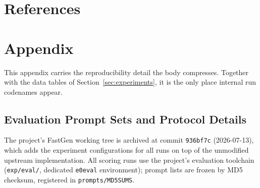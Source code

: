\documentclass[11pt,a4paper]{article}
\begin{document}
\renewcommand{\refname}{}
\section{References}\label{sec:references}
\vspace{-2em}



\section{Appendix}\label{sec:appendix}

This appendix carries the reproducibility detail the body compresses. Together with the data tables of Section~\ref{sec:experiments}, it is the only place internal run codenames appear.

\subsection{Evaluation Prompt Sets and Protocol Details}\label{sec:app-protocol}

The project's FastGen working tree is archived at commit \texttt{936bf7c} (2026-07-13), which adds the experiment configurations for all runs on top of the unmodified upstream implementation. All scoring runs use the project's evaluation toolchain (\texttt{exp/eval/}, dedicated \texttt{e0eval} environment); prompt lists are frozen by MD5 checksum, registered in \texttt{prompts/MD5SUMS}.
\end{document}
